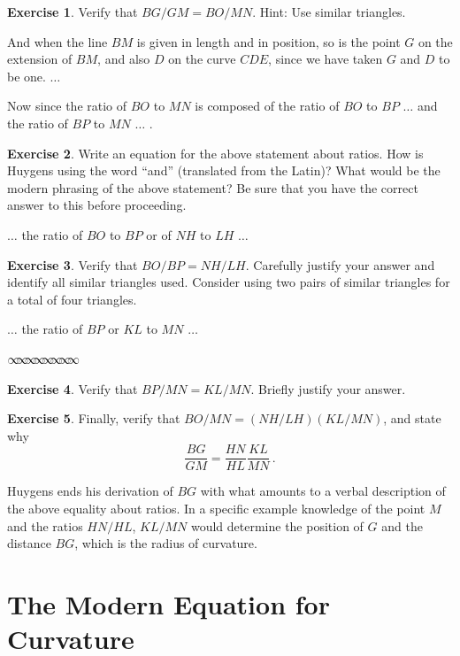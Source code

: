 \documentclass[12pt]{article}
\theoremstyle{definition}
\newtheorem{exercise}{Exercise}[section]
\newcommand{\sep}{\vspace{-3pt} \begin{center}
{\mathversion{normal}
$\infty \mspace{-5.5mu} \infty \mspace{-5.5mu}
\infty \mspace{-5.5mu} \infty \mspace{-5.5mu}
\infty \mspace{-5.5mu} \infty \mspace{-5.5mu}
\infty \mspace{-5.5mu} \infty$}
\end{center} \vspace{-3pt}}
\begin{document}
\begin{exercise}  \label{E:similar-1}
 Verify that $BG/GM = BO/MN$.  Hint:  Use similar triangles.
\end{exercise}

{\sf And when the line
$BM$ is given in length and in position, so is the point $G$ on the
extension of $BM$, and also $D$ on the curve $CDE$, since we have
taken $G$ and $D$ to be one. $\ldots$  

Now since the ratio of $BO$ to $MN$ is composed of the ratio of $BO$
to $BP$ $\ldots$ and the ratio of $BP$ to $MN$ $\ldots$ .}

\begin{exercise}  \label{E:composed-ratios}
Write an equation for the above statement about ratios.  How is
Huygens using the word ``and'' (translated from the Latin)? What
would be the modern phrasing of the above statement?  Be sure
that you have the correct answer to this before proceeding.
\end{exercise}

{\sf  $\ldots$ the ratio of $BO$ to $BP$ or of $NH$ to $LH$ $\ldots$ }


\begin{exercise}  \label{E:four-triangles}
 Verify that $BO/BP = NH/LH$.  Carefully justify your answer and identify
 all similar triangles used.  Consider using two pairs of similar triangles for
 a total of four triangles.  
\end{exercise}

{\sf $\ldots$ the ratio of $BP$ or $KL$ to $MN$ $\ldots$ }


\medskip
\sep
\bigskip

\begin{exercise}
Verify that $BP/MN = KL/MN$.  Briefly justify your answer. 
\end{exercise}


\begin{exercise} \label{E:BG}
Finally, verify that $BO/MN = (NH/LH)(KL/MN)$, and state why
$$  \frac{BG}{GM} = \frac{HN}{HL} \frac{KL}{MN} \, . $$
\end{exercise}

Huygens ends his derivation of $BG$ with what amounts to a verbal
description of the above equality about ratios.  In a specific 
example knowledge of the point $M$ and the ratios $HN/HL$, $KL/MN$ 
would determine the position
of $G$ and the distance $BG$, which is the radius of curvature.

\section{The Modern Equation for Curvature}
\end{document}
